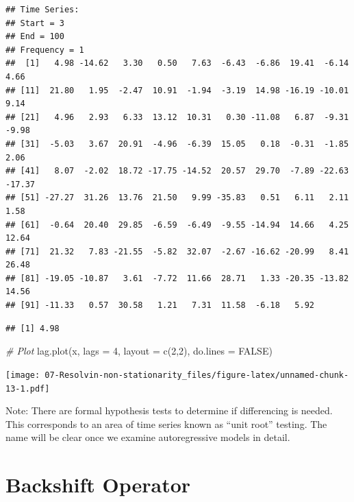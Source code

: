 \documentclass[
]{book}
\newenvironment{Shaded}{\begin{snugshade}}{\end{snugshade}}
\newcommand{\AttributeTok}[1]{\textcolor[rgb]{0.77,0.63,0.00}{#1}}
\newcommand{\CommentTok}[1]{\textcolor[rgb]{0.56,0.35,0.01}{\textit{#1}}}
\newcommand{\ConstantTok}[1]{\textcolor[rgb]{0.00,0.00,0.00}{#1}}
\newcommand{\DecValTok}[1]{\textcolor[rgb]{0.00,0.00,0.81}{#1}}
\newcommand{\FunctionTok}[1]{\textcolor[rgb]{0.00,0.00,0.00}{#1}}
\newcommand{\NormalTok}[1]{#1}
\newcommand{\SpecialCharTok}[1]{\textcolor[rgb]{0.00,0.00,0.00}{#1}}
\theoremstyle{definition}
\theoremstyle{definition}
\theoremstyle{definition}
\theoremstyle{definition}
\theoremstyle{remark}
\begin{document}
\begin{verbatim}
## Time Series:
## Start = 3 
## End = 100 
## Frequency = 1 
##  [1]   4.98 -14.62   3.30   0.50   7.63  -6.43  -6.86  19.41  -6.14   4.66
## [11]  21.80   1.95  -2.47  10.91  -1.94  -3.19  14.98 -16.19 -10.01   9.14
## [21]   4.96   2.93   6.33  13.12  10.31   0.30 -11.08   6.87  -9.31  -9.98
## [31]  -5.03   3.67  20.91  -4.96  -6.39  15.05   0.18  -0.31  -1.85   2.06
## [41]   8.07  -2.02  18.72 -17.75 -14.52  20.57  29.70  -7.89 -22.63 -17.37
## [51] -27.27  31.26  13.76  21.50   9.99 -35.83   0.51   6.11   2.11   1.58
## [61]  -0.64  20.40  29.85  -6.59  -6.49  -9.55 -14.94  14.66   4.25  12.64
## [71]  21.32   7.83 -21.55  -5.82  32.07  -2.67 -16.62 -20.99   8.41  26.48
## [81] -19.05 -10.87   3.61  -7.72  11.66  28.71   1.33 -20.35 -13.82  14.56
## [91] -11.33   0.57  30.58   1.21   7.31  11.58  -6.18   5.92
\end{verbatim}

\begin{Shaded}
\end{Shaded}

\begin{verbatim}
## [1] 4.98
\end{verbatim}

\begin{Shaded}
\begin{Highlighting}[]
\CommentTok{\# Plot}
\FunctionTok{lag.plot}\NormalTok{(x, }\AttributeTok{lags =} \DecValTok{4}\NormalTok{, }\AttributeTok{layout =} \FunctionTok{c}\NormalTok{(}\DecValTok{2}\NormalTok{,}\DecValTok{2}\NormalTok{), }\AttributeTok{do.lines =} \ConstantTok{FALSE}\NormalTok{)}
\end{Highlighting}
\end{Shaded}

\texttt{[image: 07-Resolvin-non-stationarity\_files/figure-latex/unnamed-chunk-13-1.pdf]}

Note: There are formal hypothesis tests to determine if differencing is needed. This corresponds to an area of time series known as ``unit root'' testing. The name will be clear once we examine autoregressive models in detail.

\hypertarget{backshift-operator}{%
\section{Backshift Operator}\label{backshift-operator}}
\end{document}

